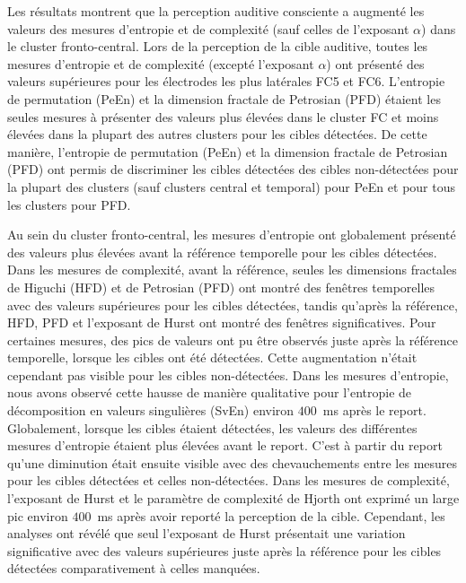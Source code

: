 Les résultats montrent que la perception auditive consciente a augmenté les valeurs des mesures d'entropie et de complexité (sauf celles de l'exposant $\alpha$) dans le cluster fronto-central. 
Lors de la perception de la cible auditive, toutes les mesures d'entropie et de complexité (excepté l'exposant $\alpha$) ont présenté des valeurs supérieures pour les électrodes les plus latérales FC5 et FC6. 
L'entropie de permutation (PeEn) et la dimension fractale de Petrosian (PFD) étaient les seules mesures à présenter des valeurs plus élevées dans le cluster FC et moins élevées dans la plupart des autres clusters pour les cibles détectées. 
De cette manière, l'entropie de permutation (PeEn) et la dimension fractale de Petrosian (PFD) ont permis de discriminer les cibles détectées des cibles non-détectées pour la plupart des clusters (sauf clusters central et temporal) pour PeEn et pour tous les clusters pour PFD.

Au sein du cluster fronto-central, les mesures d'entropie ont globalement présenté des valeurs plus élevées avant la référence temporelle pour les cibles détectées. 
Dans les mesures de complexité, avant la référence, seules les dimensions fractales de Higuchi (HFD) et de Petrosian (PFD) ont montré des fenêtres temporelles avec des valeurs supérieures pour les cibles détectées, tandis qu'après la référence, HFD, PFD et l'exposant de Hurst ont montré des fenêtres significatives. 
Pour certaines mesures, des pics de valeurs ont pu être observés juste après la référence temporelle, lorsque les cibles ont été détectées. 
Cette augmentation n'était cependant pas visible pour les cibles non-détectées.
Dans les mesures d'entropie, nous avons observé cette hausse de manière qualitative pour l'entropie de décomposition en valeurs singulières (SvEn) environ $400$~ms après le report. 
Globalement, lorsque les cibles étaient détectées, les valeurs des différentes mesures d'entropie étaient plus élevées avant le report. 
C'est à partir du report qu'une diminution était ensuite visible avec des chevauchements entre les mesures pour les cibles détectées et celles non-détectées.
Dans les mesures de complexité, l'exposant de Hurst et le paramètre de complexité de Hjorth ont exprimé un large pic environ $400$~ms après avoir reporté la perception de la cible. 
Cependant, les analyses ont révélé que seul l'exposant de Hurst présentait une variation significative avec des valeurs supérieures juste après la référence pour les cibles détectées comparativement à celles manquées.

